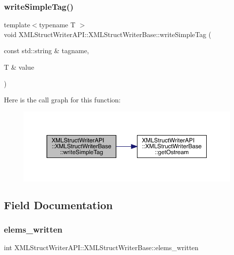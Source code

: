 \subsubsection{\texorpdfstring{writeSimpleTag()}{writeSimpleTag()}\hspace{0.1cm}{\footnotesize\ttfamily [3/3]}}
{\footnotesize\ttfamily template$<$typename T $>$ \\
void X\+M\+L\+Struct\+Writer\+A\+P\+I\+::\+X\+M\+L\+Struct\+Writer\+Base\+::write\+Simple\+Tag (\begin{DoxyParamCaption}\item[{const std\+::string \&}]{tagname,  }\item[{T \&}]{value }\end{DoxyParamCaption})\hspace{0.3cm}{\ttfamily [inline]}}

Here is the call graph for this function\+:
\nopagebreak
\begin{figure}[H]
\begin{center}
\leavevmode
\includegraphics[width=350pt]{db/d4f/classXMLStructWriterAPI_1_1XMLStructWriterBase_a049c80e79c8f64d2b6b0221c01392d37_cgraph}
\end{center}
\end{figure}


\subsection{Field Documentation}
\mbox{\label{classXMLStructWriterAPI_1_1XMLStructWriterBase_a255acd33078c52b9bd9b1f0414cd03e3}} 
\subsubsection{\texorpdfstring{elems\_written}{elems\_written}}
{\footnotesize\ttfamily int X\+M\+L\+Struct\+Writer\+A\+P\+I\+::\+X\+M\+L\+Struct\+Writer\+Base\+::elems\+\_\+written\hspace{0.3cm}{\ttfamily [protected]}}

